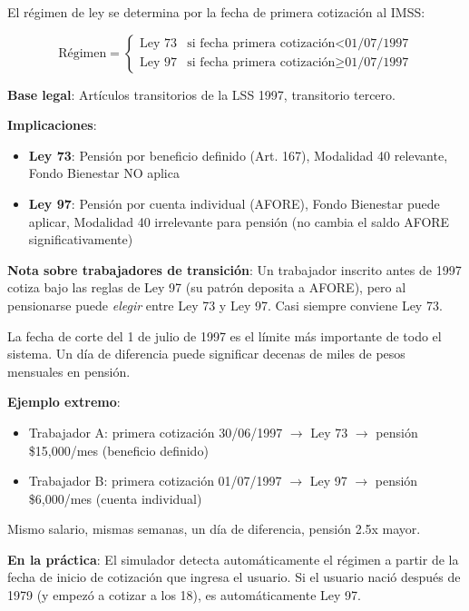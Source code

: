 \documentclass[11pt,a4paper]{report}
\begin{document}
\begin{tcolorbox}[colback=blue!5!white, colframe=blue!75!black, title=\textbf{Definici\'on Formal}]
El r\'egimen de ley se determina por la fecha de primera cotizaci\'on al IMSS:

\[
\text{R\'egimen} = \begin{cases}
\text{Ley 73} & \text{si fecha primera cotizaci\'on} < \text{01/07/1997} \\
\text{Ley 97} & \text{si fecha primera cotizaci\'on} \geq \text{01/07/1997}
\end{cases}
\]

\textbf{Base legal}: Art\'iculos transitorios de la LSS 1997, transitorio tercero.

\textbf{Implicaciones}:
\begin{itemize}[nosep]
\item \textbf{Ley 73}: Pensi\'on por beneficio definido (Art. 167), Modalidad 40 relevante, Fondo Bienestar NO aplica
\item \textbf{Ley 97}: Pensi\'on por cuenta individual (AFORE), Fondo Bienestar puede aplicar, Modalidad 40 irrelevante para pensi\'on (no cambia el saldo AFORE significativamente)
\end{itemize}

\textbf{Nota sobre trabajadores de transici\'on}: Un trabajador inscrito antes de 1997 cotiza bajo las reglas de Ley 97 (su patr\'on deposita a AFORE), pero al pensionarse puede \emph{elegir} entre Ley 73 y Ley 97. Casi siempre conviene Ley 73.
\end{tcolorbox}

\begin{tcolorbox}[colback=green!5!white, colframe=green!50!black, title=\textbf{Intuici\'on}]
La fecha de corte del 1 de julio de 1997 es el l\'imite m\'as importante de todo el sistema. Un d\'ia de diferencia puede significar decenas de miles de pesos mensuales en pensi\'on.

\textbf{Ejemplo extremo}:
\begin{itemize}[nosep]
\item Trabajador A: primera cotizaci\'on 30/06/1997 $\rightarrow$ Ley 73 $\rightarrow$ pensi\'on \$15,000/mes (beneficio definido)
\item Trabajador B: primera cotizaci\'on 01/07/1997 $\rightarrow$ Ley 97 $\rightarrow$ pensi\'on \$6,000/mes (cuenta individual)
\end{itemize}

Mismo salario, mismas semanas, un d\'ia de diferencia, pensi\'on 2.5x mayor.

\textbf{En la pr\'actica}: El simulador detecta autom\'aticamente el r\'egimen a partir de la fecha de inicio de cotizaci\'on que ingresa el usuario. Si el usuario naci\'o despu\'es de 1979 (y empez\'o a cotizar a los 18), es autom\'aticamente Ley 97.
\end{tcolorbox}
\end{document}

